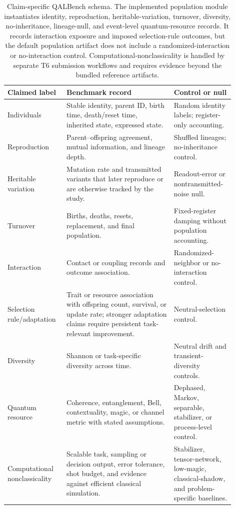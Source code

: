 \documentclass[11pt]{article}
\begin{document}
\begin{table}[t]
\centering
\scriptsize
\setlength{\tabcolsep}{4pt}
\begin{tabular}{P{0.22\linewidth}P{0.44\linewidth}P{0.24\linewidth}}
\toprule
\textbf{Claimed label} & \textbf{Benchmark record} & \textbf{Control or null} \\
\midrule
Individuals & Stable identity, parent ID, birth time, death/reset time, inherited state, expressed state. & Random identity labels; register-only accounting. \\
Reproduction & Parent--offspring agreement, mutual information, and lineage depth. & Shuffled lineages; no-inheritance control. \\
Heritable variation & Mutation rate and transmitted variants that later reproduce or are otherwise tracked by the study. & Readout-error or nontransmitted-noise null. \\
Turnover & Births, deaths, resets, replacement, and final population. & Fixed-register damping without population accounting. \\
Interaction & Contact or coupling records and outcome association. & Randomized-neighbor or no-interaction control. \\
Selection rule/adaptation & Trait or resource association with offspring count, survival, or update rate; stronger adaptation claims require persistent task-relevant improvement. & Neutral-selection control. \\
Diversity & Shannon or task-specific diversity across time. & Neutral drift and transient-diversity controls. \\
Quantum resource & Coherence, entanglement, Bell, contextuality, magic, or channel metric with stated assumptions. & Dephased, Markov, separable, stabilizer, or process-level control. \\
Computational nonclassicality & Scalable task, sampling or decision output, error tolerance, shot budget, and evidence against efficient classical simulation. & Stabilizer, tensor-network, low-magic, classical-shadow, and problem-specific baselines. \\
\bottomrule
\end{tabular}
\caption{Claim-specific QALBench schema. The implemented population module instantiates identity, reproduction, heritable-variation, turnover, diversity, no-inheritance, lineage-null, and event-level quantum-resource records. It records interaction exposure and imposed selection-rule outcomes, but the default population artifact does not include a randomized-interaction or no-interaction control. Computational-nonclassicality is handled by separate T6 submission workflows and requires evidence beyond the bundled reference artifacts.}
\label{tab:schema}
\end{table}
\end{document}
